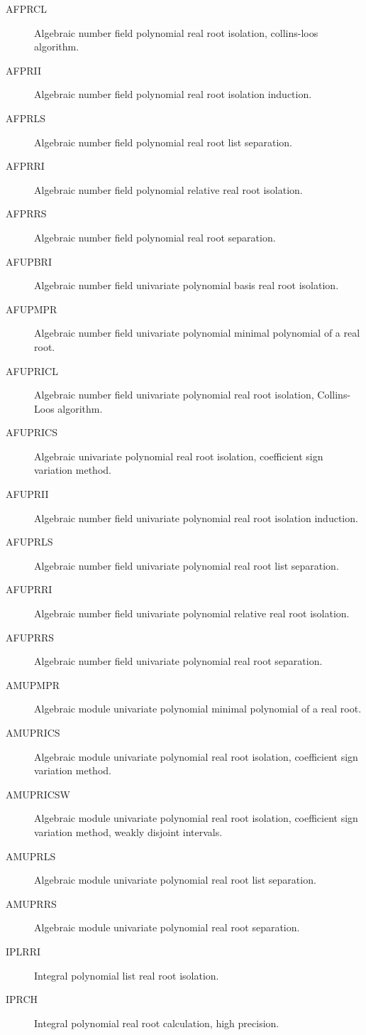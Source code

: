 \begin{description}
\begin{description}
  \item[AFPRCL]  Algebraic number field polynomial real root isolation,
    collins-loos algorithm.
  \item[AFPRII]  Algebraic number field polynomial real root isolation
    induction.
  \item[AFPRLS]  Algebraic number field polynomial real root list separation.
  \item[AFPRRI]  Algebraic number field polynomial relative real root
    isolation.
  \item[AFPRRS]  Algebraic number field polynomial real root separation.
  \item[AFUPBRI]  Algebraic number field univariate polynomial basis real root
    isolation.
  \item[AFUPMPR]  Algebraic number field univariate polynomial minimal
    polynomial of a real root.
  \item[AFUPRICL]  Algebraic number field univariate polynomial real root
    isolation, Collins-Loos algorithm.
  \item[AFUPRICS]  Algebraic univariate polynomial real root isolation,
    coefficient sign variation method.
  \item[AFUPRII]  Algebraic number field univariate polynomial real root
    isolation induction.
  \item[AFUPRLS]  Algebraic number field univariate polynomial real root list
    separation.
  \item[AFUPRRI]  Algebraic number field univariate polynomial relative real
    root isolation.
  \item[AFUPRRS]  Algebraic number field univariate polynomial real root
    separation.
  \item[AMUPMPR]  Algebraic module univariate polynomial minimal polynomial of
    a real root.
  \item[AMUPRICS]  Algebraic module univariate polynomial real root isolation,
    coefficient sign variation method.
  \item[AMUPRICSW]  Algebraic module univariate polynomial real root
    isolation, coefficient sign variation method, weakly disjoint intervals.
  \item[AMUPRLS]  Algebraic module univariate polynomial real root list
    separation.
  \item[AMUPRRS]  Algebraic module univariate polynomial real root separation.
  \item[IPLRRI]  Integral polynomial list real root isolation.
  \item[IPRCH]  Integral polynomial real root calculation, high precision.

\end{description}
\end{description}
